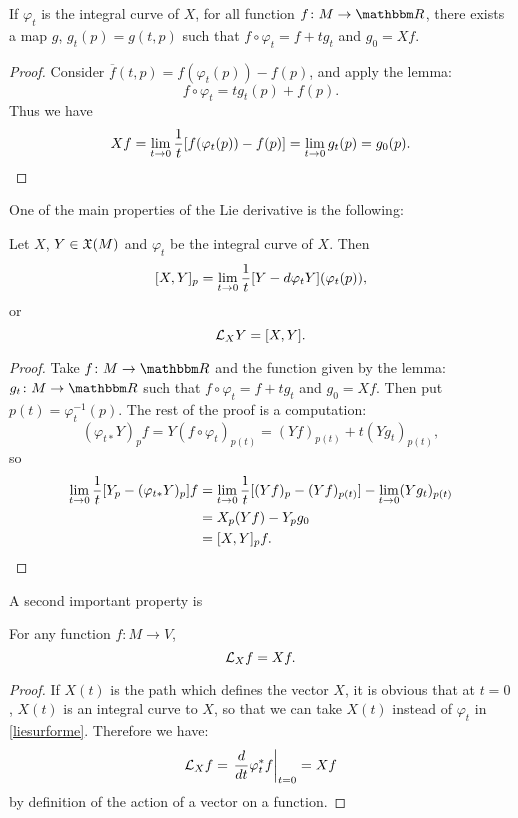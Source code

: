 \begin{lemma}
If $\varphi_t$ is the integral curve of $X$, for all function $\dpt{f}{M}{\eR}$, there exists a map $g$, $g_t(p)=g(t,p)$ such that
$f\circ\varphi_t=f+tg_t$ and $g_0=Xf$.
\end{lemma}

\begin{proof}
Consider $\overline{f}(t,p)=f(\varphi_t(p))-f(p)$, and apply the lemma:
\[
          f\circ\varphi_t=tg_t(p)+f(p).
\]
Thus we have
\[
      Xf=\lim_{t\to 0}\frac{1}{t}[f(\varphi_t(p))-f(p)]=\lim_{t\to 0}g_t(p)=g_0(p).
\]
\end{proof}

One of the main properties of the Lie derivative is the following:
\begin{theorem}		\label{ThoLieDerrComm}
Let $X$, $Y\in\mathfrak{X}(M)$ and $\varphi_t$ be the integral curve of $X$. Then
\[
         [X,Y]_p=\lim_{t\to 0}\frac{1}{t}[Y-d\varphi_tY](\varphi_t(p)),
\]
or
\[
          \mathcal{L}_XY=[X,Y].
\]

\end{theorem}
\begin{proof}
Take $\dpt{f}{M}{\eR}$ and the function given by the lemma: $\dpt{g_t}{M}{\eR}$ such that $f\circ \varphi_t=f+tg_t$ and $g_0=Xf$. Then put $p(t)=\varphi_t^{-1}(p)$. The rest of the proof is a computation:
\[
            (\varphi_{t*}Y)_pf=Y(f\circ\varphi_t)_{p(t)}=(Yf)_{p(t)}+t(Yg_t)_{p(t)},
\]
so
\begin{equation}
\begin{split}
  \lim_{t\to 0}\frac{1}{t}[Y_p-(\varphi_{t*}Y)_p]f&=\lim_{t\to 0}\frac{1}{t}[(Yf)_p-(Yf)_{p(t)}]-\lim_{t\to 0}(Yg_t)_{p(t)}\\
                                         &=X_p(Yf)-Y_pg_0\\
                                         &=[X,Y]_pf.
\end{split}
\end{equation}

\end{proof}

A second important property is
\begin{theorem}
For any function $f\colon M\to V$,
\[
           \mathcal{L}_Xf=Xf.
\]
\end{theorem}

\begin{proof}
If $X(t)$ is the path which defines the vector $X$, it is obvious that at $t=0$, $X(t)$ is an integral curve to $X$, so that we can take $X(t)$ instead of $\varphi_t$ in \eqref{liesurforme}. Therefore we have:
\begin{equation}
    \mathcal{L}_Xf=\left.\frac{d}{dt}\varphi_t^*f\right|_{t=0}
          =Xf
\end{equation}
by definition of the action of a vector on a function.
\end{proof}

